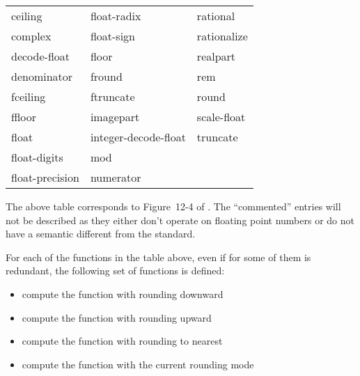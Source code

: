 \documentclass[../../Operations.tex]{subfiles}
\begin{document}
\label{sect:transc-ops}

\begin{tt}
  \begin{tabular}{lll}
    ceiling & float-radix & rational\\
    complex &  float-sign &  rationalize\\
    decode-float & floor  &  realpart\\
    denominator &  fround &  rem\\
    fceiling & ftruncate &  round\\
    ffloor &  imagepart &   scale-float\\
    float & integer-decode-float & truncate\\
    float-digits & mod & \\
    float-precision & numerator & \\
  \end{tabular}
\end{tt}

\vspace*{3mm}

\noindent
The above table corresponds to Figure~12-4 of \cite{1996:ANSIHyperSpec}.
The ``commented'' entries will not be described as they either don't
operate on floating point numbers or do not have a semantic different
from the \CL{} standard.

\noindent
For each of the functions in the table above, even if for some of them is
redundant, the following set of functions is defined:
\begin{itemize}
\item {} compute the function with rounding downward
\item {} compute the function with rounding upward
\item {} compute the function with rounding to nearest
\item {} compute the function with the current rounding mode
\end{itemize}
\vspace*{3mm}



\end{document}
